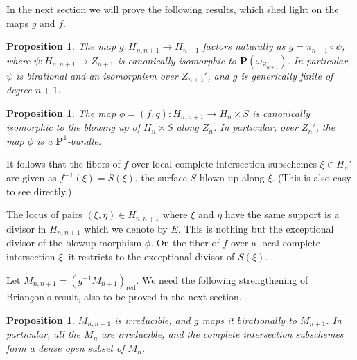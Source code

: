 \documentclass[12pt]{amsart}
\def\Hn{H_n}
\def\Hnn{H_{n,n+1}}
\def\Hnp{H_{n+1}}
\let\:=\colon
\def\i{^{-1}}
\def\PP{{\mathbf P}}
\def\x{\times}
\def\tilde{\widetilde}
\newtheorem{prop}[thm]{Proposition}
\theoremstyle{definition}
\theoremstyle{remark}
\numberwithin{equation}{section}
\begin{document}
In the next section we will prove the following results, which
shed light on the maps $g$ and $f$.

\begin{prop}\label{structure1}
  The map $g\:\Hnn\to\Hnp$ factors naturally as
  $g=\pi_{n+1}\circ\psi$, where $\psi\:\Hnn\to Z_{n+1}$ is canonically
  isomorphic to $\PP(\omega_{Z_{n+1}})$.  In
  particular, $\psi$ is birational and an isomorphism over $Z_{n+1}'$,
  and $g$ is generically finite of degree $n+1$.
\end{prop}

\begin{prop}\label{structure2}
  The map $\phi=(f,q)\:\Hnn\to\Hn\x S$ is canonically isomorphic to
  the blowing up of $\Hn\x S$ along $Z_n$. In particular, over $Z_n'$,
  the map $\phi$ is a
  $\PP^1$-bundle.
\end{prop}

It follows that the fibers of $f$ over local complete intersection
subschemes $\xi\in\Hn'$ are given as $f\i(\xi)=\tilde S(\xi)$, the
surface $S$ blown up along $\xi$. (This is also easy to see directly.)

The locus of pairs $(\xi,\eta)\in \Hnn$ where $\xi$ and $\eta$ have
the same support is a divisor in $\Hnn$ which we denote by $E$. This
is nothing but the exceptional divisor of the blowup morphism $\phi$.
On the fiber of $f$ over a local complete intersection $\xi$, it
restricts to the exceptional divisor of $\tilde S(\xi)$.

Let $M_{n,n+1}=(g\i M_{n+1})_{\text{red}}$. We need the following
strengthening of Brian\c con's result, also to be proved in the next
section.

\begin{prop}\label{structure3}
  $M_{n,n+1}$ is irreducible, and $g$ maps it birationally to
  $M_{n+1}$. In particular, all the $M_n$ are irreducible, and the
  complete intersection subschemes form a dense open subset of $M_n$.
\end{prop}
\end{document}
